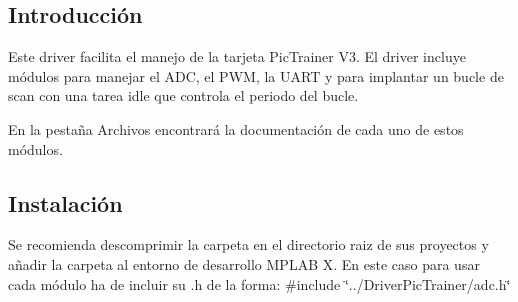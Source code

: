 \hypertarget{index_intro_sec}{}\subsection{Introducción}\label{index_intro_sec}
Este driver facilita el manejo de la tarjeta Pic\+Trainer V3. El driver incluye módulos para manejar el A\+DC, el P\+WM, la U\+A\+RT y para implantar un bucle de scan con una tarea idle que controla el periodo del bucle.

En la pestaña Archivos encontrará la documentación de cada uno de estos módulos.\hypertarget{index_install_sec}{}\subsection{Instalación}\label{index_install_sec}
Se recomienda descomprimir la carpeta en el directorio raiz de sus proyectos y añadir la carpeta al entorno de desarrollo M\+P\+L\+AB X. En este caso para usar cada módulo ha de incluir su .h de la forma\+: \#include \char`\"{}../\+Driver\+Pic\+Trainer/adc.\+h\char`\"{} 